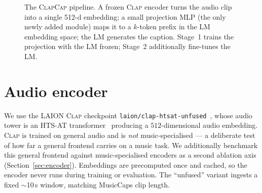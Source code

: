 \documentclass[9pt]{report}
\newcommand{\clapenc}{\textsc{Clap}}
\newcommand{\sys}{\textsc{ClapCap}}
\begin{document}
\begin{figure}[htbp]\centering
\footnotesize
{}
\caption{The \sys{} pipeline. A frozen \clapenc{} encoder turns the audio clip into a single
512-d embedding; a small projection MLP (the only newly added module) maps it to a $k$-token
prefix in the LM embedding space; the LM generates the caption. Stage~1 trains the projection
with the LM frozen; Stage~2 additionally fine-tunes the LM.}
\label{fig:pipeline}
\end{figure}

\section{Audio encoder}
We use the LAION \clapenc{} checkpoint \texttt{laion/clap-htsat-unfused}~\cite{wu2023clap},
whose audio tower is an HTS-AT transformer~\cite{chen2022htsat} producing a $512$-dimensional
audio embedding. \clapenc{} is trained on general audio and is \emph{not}
music-specialised --- a deliberate test of how far a general frontend carries on a music task.
We additionally benchmark this general frontend against music-specialised encoders as a second
ablation axis (Section~\ref{sec:encoder}). Embeddings are precomputed once and cached, so the
encoder never runs during training or evaluation. The ``unfused'' variant ingests a fixed
$\sim$10\,s window, matching MusicCaps clip length.
\end{document}
